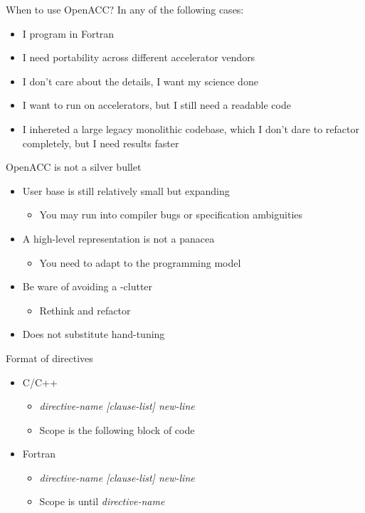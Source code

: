 \documentclass[12pt,aspectratio=169]{beamer}
\begin{document}
\begin{frame}{When to use OpenACC?}
  In any of the following cases:
  \vspace\baselineskip
  \begin{itemize}
  \item I program in Fortran
  \item I need portability across different accelerator vendors
  \item I don't care about the details, I want my science done
  \item I want to run on accelerators, but I still need a readable code
  \item I inhereted a large legacy monolithic codebase, which I don't dare to
    refactor completely, but I need results faster
  \end{itemize}
\end{frame}

\begin{frame}{OpenACC is not a silver bullet}
  \begin{itemize}
  \item User base is still relatively small but expanding
    \begin{itemize}
    \item You may run into compiler bugs or specification ambiguities
    \end{itemize}
  \item A high-level representation is not a panacea
    \begin{itemize}
    \item You need to adapt to the programming model
    \end{itemize}
  \item Be ware of avoiding a -clutter
    \begin{itemize}
    \item Rethink and refactor
    \end{itemize}
  \item Does not substitute hand-tuning
  \end{itemize}
\end{frame}

\begin{frame}[fragile]{Format of directives}
  \begin{itemize}
  \item C/C++
    \begin{itemize}
    \item {} \emph{directive-name [clause-list]
      new-line}
    \item Scope is the following block of code
    \end{itemize}
  \item Fortran
    \begin{itemize}
    \item {} \emph{directive-name [clause-list]
      new-line}
    \item Scope is until  \emph{directive-name}
    \end{itemize}
  \end{itemize}
\end{frame}
\end{document}
